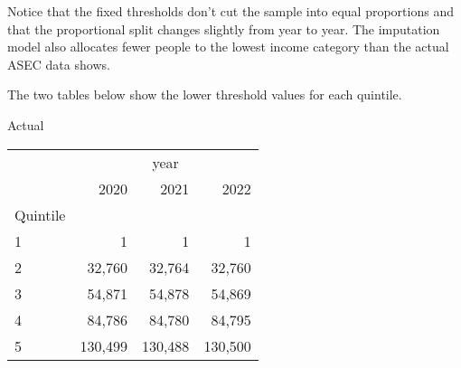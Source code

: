 \documentclass{article}
\begin{document}
	Notice that the fixed thresholds don't cut the sample into equal proportions and that the proportional split changes slightly from year to year. The imputation model also allocates fewer people to the lowest income category than the actual ASEC data shows. 
	
	The two tables below show the lower threshold values for each quintile.
	
		\begin{minipage}[b]{.40\textwidth}
		\centering
		Actual
	\centering
	\begin{tabular}{llll}
		\cline{1-4}
		\multicolumn{1}{c}{} &
		\multicolumn{3}{|c}{year} \\
		\multicolumn{1}{c}{} &
		\multicolumn{1}{|r}{2020} &
		\multicolumn{1}{r}{2021} &
		\multicolumn{1}{r}{2022} \\
		\cline{1-4}
		\multicolumn{1}{l}{Quintile} &
		\multicolumn{1}{|r}{} &
		\multicolumn{1}{r}{} &
		\multicolumn{1}{r}{} \\
		\multicolumn{1}{l}{\hspace{1em}1} &
		\multicolumn{1}{|r}{1} &
		\multicolumn{1}{r}{1} &
		\multicolumn{1}{r}{1} \\
		\multicolumn{1}{l}{\hspace{1em}2} &
		\multicolumn{1}{|r}{32,760} &
		\multicolumn{1}{r}{32,764} &
		\multicolumn{1}{r}{32,760} \\
		\multicolumn{1}{l}{\hspace{1em}3} &
		\multicolumn{1}{|r}{54,871} &
		\multicolumn{1}{r}{54,878} &
		\multicolumn{1}{r}{54,869} \\
		\multicolumn{1}{l}{\hspace{1em}4} &
		\multicolumn{1}{|r}{84,786} &
		\multicolumn{1}{r}{84,780} &
		\multicolumn{1}{r}{84,795} \\
		\multicolumn{1}{l}{\hspace{1em}5} &
		\multicolumn{1}{|r}{130,499} &
		\multicolumn{1}{r}{130,488} &
		\multicolumn{1}{r}{130,500} \\
		\cline{1-4}
	\end{tabular}
	\end{minipage}\qquad
\end{document}
